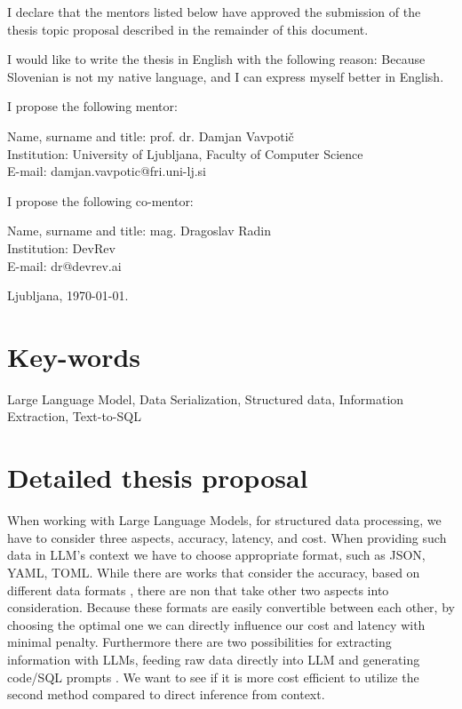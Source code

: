 \documentclass[a4paper, 12pt]{article}
\begin{document}
I declare that the mentors listed below have approved the submission of the thesis topic proposal described
in the remainder of this document.

I would like to write the thesis in English with the following reason: Because Slovenian is not my native
language, and I can express myself better in English.

I propose the following mentor:

\hfill
\begin{minipage}{\dimexpr\textwidth-2cm}
  Name, surname and title: prof. dr. Damjan Vavpotič\\
  Institution: University of Ljubljana, Faculty of Computer Science \\
  E-mail: damjan.vavpotic@fri.uni-lj.si
\end{minipage}

I propose the following co-mentor:

\hfill
\begin{minipage}{\dimexpr\textwidth-2cm}
  Name, surname and title: mag. Dragoslav Radin\\
  Institution: DevRev \\
  E-mail: dr@devrev.ai
\end{minipage}

\bigskip

\hfill Ljubljana, \today. \newpage

\section*{Key-words}
Large Language Model, Data Serialization, Structured data, Information Extraction, Text-to-SQL

\section*{Detailed thesis proposal}

\ProblemParagraph
When working with Large Language Models, for structured data processing, we have to consider three aspects,
accuracy, latency, and cost. When providing such data in LLM's context we have to choose appropriate format,
such as JSON, YAML, TOML. While there are works that consider the accuracy, based on different data formats
\cite{struct-text-eval}, there are non that take other two aspects into consideration. Because these formats
are easily convertible between each other, by choosing the optimal one we can directly influence our cost and
latency with minimal penalty. Furthermore there are two possibilities for extracting information with LLMs,
feeding raw data directly into LLM \cite{struct-text-eval} and generating code/SQL prompts \cite{gao2023text,
li2023can, gao2023pal}. We want to see if it is more cost efficient to utilize the second method compared to
direct inference from context.
\end{document}
